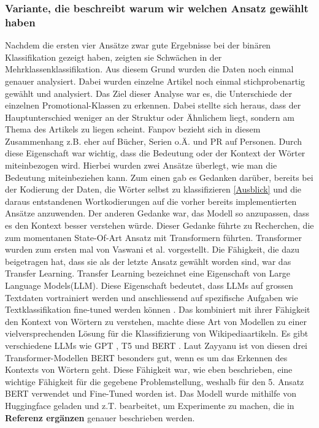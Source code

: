 \subsubsection{Variante, die beschreibt warum wir welchen Ansatz gewählt haben}
Nachdem die ersten vier Ansätze zwar gute Ergebnisse bei der binären Klassifikation gezeigt haben, zeigten sie Schwächen in der Mehrklassenklassifikation. Aus diesem Grund wurden die Daten noch einmal genauer analysiert. Dabei wurden einzelne Artikel noch einmal stichprobenartig gewählt und analysiert. Das Ziel dieser Analyse war es, die Unterschiede der einzelnen Promotional-Klassen zu erkennen. Dabei stellte sich heraus, dass der Hauptunterschied weniger an der Struktur oder Ähnlichem liegt, sondern am Thema des Artikels zu liegen scheint. Fanpov bezieht sich in diesem Zusammenhang z.B. eher auf Bücher, Serien o.Ä. und PR auf Personen. Durch diese Eigenschaft war wichtig, dass die Bedeutung oder der Kontext der Wörter miteinbezogen wird. Hierbei wurden zwei Ansätze überlegt, wie man die Bedeutung miteinbeziehen kann. Zum einen gab es Gedanken darüber, bereits bei der Kodierung der Daten, die Wörter selbst zu klassifizieren \ref{Ausblick} und die daraus entstandenen Wortkodierungen auf die vorher bereits implementierten Ansätze anzuwenden. Der anderen Gedanke war, das Modell so anzupassen, dass es den Kontext besser verstehen würde. Dieser Gedanke führte zu Recherchen, die zum momentanen State-Of-Art Ansatz mit Transformern führten. Transformer wurden zum ersten mal von Vaswani et al. \cite{Attention} vorgestellt. Die Fähigkeit, die dazu beigetragen hat, dass sie als der letzte Ansatz gewählt worden sind, war das Transfer Learning. Transfer Learning bezeichnet eine Eigenschaft von Large Language Models(LLM).
Diese Eigenschaft bedeutet, dass LLMs auf grossen Textdaten vortrainiert werden und anschliessend auf spezifische Aufgaben wie Textklassifikation fine-tuned werden können \cite{9783960108535}. Das kombiniert mit ihrer Fähigkeit den Kontext von Wörtern zu verstehen, machte diese Art von Modellen zu einer vielversprechenden Lösung für die Klassifizierung von Wikipediaartikeln. Es gibt verschiedene LLMs wie GPT \cite{yenduri2023generativepretrainedtransformercomprehensive}, T5 \cite{DBLP:journals/corr/abs-1910-10683} und BERT \cite{BERTReference}. Laut Zayyanu \cite{article_comparing_LLMs} ist von diesen drei Transformer-Modellen BERT besonders gut, wenn es um das Erkennen des Kontexts von Wörtern geht. Diese Fähigkeit war, wie eben beschrieben, eine wichtige Fähigkeit für die gegebene Problemstellung, weshalb für den 5. Ansatz BERT verwendet und Fine-Tuned worden ist. Das Modell wurde mithilfe von Huggingface \cite{huggingfaceQuelle} geladen und z.T. bearbeitet, um Experimente zu machen, die in \textbf{Referenz ergänzen} genauer beschrieben werden.


